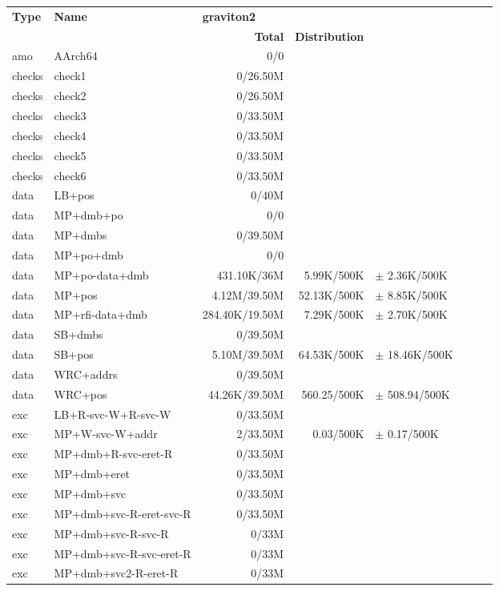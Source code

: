 \begin{tabular}{l l  | r r l | r r l}
\textbf{Type} & \textbf{Name} & \multicolumn{3}{l}{\textbf{graviton2}} \\
& & \textbf{Total} & \textbf{Distribution} &  \\
   amo&AArch64&0/0&&&\\
\hline
   checks&check1&0/26.50M&&&\\
\hline
   checks&check2&0/26.50M&&&\\
\hline
   checks&check3&0/33.50M&&&\\
\hline
   checks&check4&0/33.50M&&&\\
\hline
   checks&check5&0/33.50M&&&\\
\hline
   checks&check6&0/33.50M&&&\\
\hline
   data&LB+pos&0/40M&&&\\
\hline
   data&MP+dmb+po&0/0&&&\\
\hline
   data&MP+dmbs&0/39.50M&&&\\
\hline
   data&MP+po+dmb&0/0&&&\\
\hline
   data&MP+po-data+dmb&431.10K/36M&5.99K/500K&$\pm$ 2.36K/500K&\\
\hline
   data&MP+pos&4.12M/39.50M&52.13K/500K&$\pm$ 8.85K/500K&\\
\hline
   data&MP+rfi-data+dmb&284.40K/19.50M&7.29K/500K&$\pm$ 2.70K/500K&\\
\hline
   data&SB+dmbs&0/39.50M&&&\\
\hline
   data&SB+pos&5.10M/39.50M&64.53K/500K&$\pm$ 18.46K/500K&\\
\hline
   data&WRC+addrs&0/39.50M&&&\\
\hline
   data&WRC+pos&44.26K/39.50M&560.25/500K&$\pm$ 508.94/500K&\\
\hline
   exc&LB+R-svc-W+R-svc-W&0/33.50M&&&\\
\hline
   exc&MP+W-svc-W+addr&2/33.50M&0.03/500K&$\pm$ 0.17/500K&\\
\hline
   exc&MP+dmb+R-svc-eret-R&0/33.50M&&&\\
\hline
   exc&MP+dmb+eret&0/33.50M&&&\\
\hline
   exc&MP+dmb+svc&0/33.50M&&&\\
\hline
   exc&MP+dmb+svc-R-eret-svc-R&0/33.50M&&&\\
\hline
   exc&MP+dmb+svc-R-svc-R&0/33M&&&\\
\hline
   exc&MP+dmb+svc-R-svc-eret-R&0/33M&&&\\
\hline
   exc&MP+dmb+svc2-R-eret-R&0/33M&&&\\

\end{tabular}
